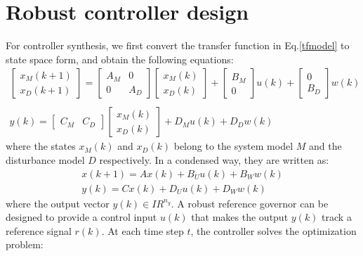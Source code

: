 \documentclass[letterpaper, 10 pt, conference]{ieeeconf}  %
\begin{document}
  \section{Robust controller design}
  For controller synthesis, we first
  convert the transfer function in Eq.\eqref{tfmodel} to state space form, and obtain the following equations:
  \begin{equation} 
  \begin{matrix}
  \begin{bmatrix}
  x_M(k+1) \\ x_D(k+1)
  \end{bmatrix} = 
  \begin{bmatrix}
  A_M & 0 \\ 0 & A_D
  \end{bmatrix}
  \begin{bmatrix}
  x_M(k) \\ x_D(k)
  \end{bmatrix} + 
  \begin{bmatrix}
  B_M \\ 0
  \end{bmatrix}
  u(k)+ 
  \begin{bmatrix}
  0 \\ B_D
  \end{bmatrix}
  w(k) \\ \\
  y(k) = 
  \begin{bmatrix}
  C_M & C_D
  \end{bmatrix}
  \begin{bmatrix}
  x_M(k) \\ x_D(k)
  \end{bmatrix}
  + D_Mu(k) + D_Dw(k) 
  \end{matrix}
  \label{ssmodel}
  \end{equation}
  where the states $x_M(k)$ and $x_D(k)$ belong to the system model $M$ and the disturbance model $D$ respectively. 
  In a condensed way, they are written as:
  \begin{equation}
  \begin{matrix}
    x(k+1)=Ax(k)+B_Uu(k)+B_Ww(k) \\
    y(k)=Cx(k)+D_Uu(k)+D_Ww(k) 
    \end{matrix} 
        \label{ssmodel_condensed}
    \end{equation}
 where the output vector $y(k) \in I\!R^{n_y}$.
  A robust reference governor can be designed to provide a control input $u(k)$ that makes the output $y(k)$ 
  track a reference signal $r(k)$. At each time step $t$, the controller solves the optimization problem:
\end{document}
